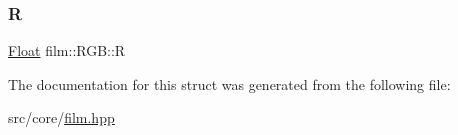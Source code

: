 \mbox{\label{structfilm_1_1RGB_a194e76e3c32f7aac8234387966f70f31}} 
\subsubsection{\texorpdfstring{R}{R}}
{\footnotesize\ttfamily \mbox{\hyperlink{cyclop_8hpp_a07afd7094cb489cbd514c76e6f55d34f}{Float}} film\+::\+R\+G\+B\+::R}



The documentation for this struct was generated from the following file\+:\begin{DoxyCompactItemize}
\item 
src/core/\mbox{\hyperlink{film_8hpp}{film.\+hpp}}\end{DoxyCompactItemize}
